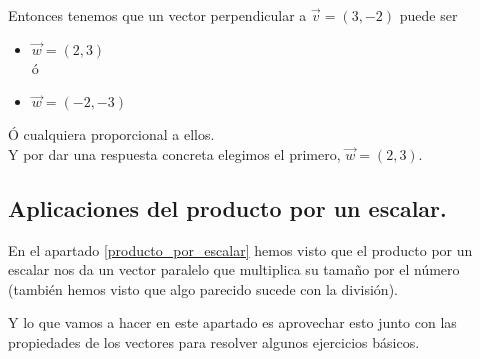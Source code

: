 \documentclass[a4paper,11pt,answers]{exam}
\begin{document}
\begin{questions}
\begin{solution}
    Entonces tenemos que un vector perpendicular a $\vec{v} = (3, -2)$ puede ser
    \begin{itemize}
    \item $\vec{w} = (2, 3)$\\
      ó
    \item $\vec{w} = (-2, -3)$
    \end{itemize}
    Ó cualquiera proporcional a ellos.\\

    Y por dar una respuesta concreta elegimos el primero, $\vec{w} = (2, 3)$.
  \end{solution}
\end{questions}
\subsection{Aplicaciones del producto por un escalar.}
En el apartado \ref{producto_por_escalar} hemos visto que el producto por un escalar nos da un
vector paralelo que multiplica su tamaño por el número (también hemos visto que algo parecido
sucede con la división).

Y lo que vamos a hacer en este apartado es aprovechar esto junto con las propiedades de los vectores para resolver algunos ejercicios básicos.\\
\end{document}
